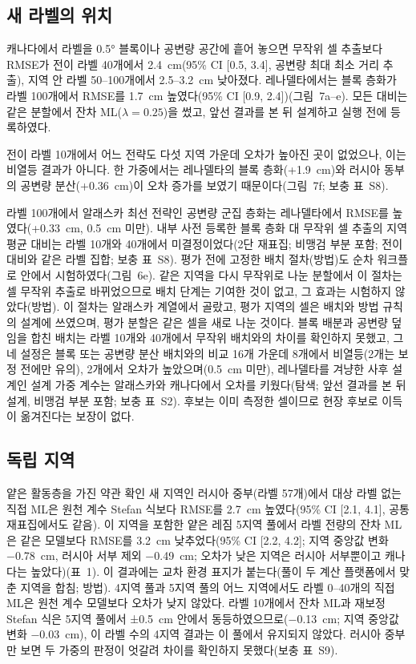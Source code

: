 \subsection{새 라벨의 위치}
\label{sec:results-placement}

캐나다에서 라벨을 0.5° 블록이나 공변량 공간에 흩어 놓으면 무작위 셀 추출보다 RMSE가 전이 라벨 40개에서 2.4~cm(95\% CI [0.5, 3.4], 공변량 최대 최소 거리 추출), 지역 안 라벨 50--100개에서 2.5--3.2~cm 낮아졌다. 레나델타에서는 블록 층화가 라벨 100개에서 RMSE를 1.7~cm 높였다(95\% CI [0.9, 2.4])(그림~7a--e).
모든 대비는 같은 분할에서 잔차 ML($\lambda = 0.25$)을 썼고, 앞선 결과를 본 뒤 설계하고 실행 전에 등록하였다.

전이 라벨 10개에서 어느 전략도 다섯 지역 가운데 오차가 높아진 곳이 없었으나, 이는 비열등 결과가 아니다. 한 가중에서는 레나델타의 블록 층화(+1.9~cm)와 러시아 동부의 공변량 분산(+0.36~cm)이 오차 증가를 보였기 때문이다(그림~7f; 보충 표~S8).

라벨 100개에서 알래스카 최선 전략인 공변량 군집 층화는 레나델타에서 RMSE를 높였다(+0.33~cm, 0.5~cm 미만).
내부 사전 등록한 블록 층화 대 무작위 셀 추출의 지역 평균 대비는 라벨 10개와 40개에서 미결정이었다(2단 재표집; 비맹검 부분 포함; 전이 대비와 같은 라벨 집합; 보충 표~S8).
평가 전에 고정한 배치 절차(방법)도 순차 워크플로 안에서 시험하였다(그림~6e).
같은 지역을 다시 무작위로 나눈 분할에서 이 절차는 셀 무작위 추출로 바뀌었으므로 배치 단계는 기여한 것이 없고, 그 효과는 시험하지 않았다(방법). 이 절차는 알래스카 계열에서 골랐고, 평가 지역의 셀은 배치와 방법 규칙의 설계에 쓰였으며, 평가 분할은 같은 셀을 새로 나눈 것이다.
블록 배분과 공변량 덮임을 합친 배치는 라벨 10개와 40개에서 무작위 배치와의 차이를 확인하지 못했고, 그 네 설정은 블록 또는 공변량 분산 배치와의 비교 16개 가운데 8개에서 비열등(2개는 보정 전에만 유의), 2개에서 오차가 높았으며(0.5~cm 미만), 레나델타를 겨냥한 사후 설계인 설계 가중 계수는 알래스카와 캐나다에서 오차를 키웠다(탐색; 앞선 결과를 본 뒤 설계, 비맹검 부분 포함; 보충 표~S2).
후보는 이미 측정한 셀이므로 현장 후보로 이득이 옮겨진다는 보장이 없다.

\subsection{독립 지역}
\label{sec:results-independent}

얕은 활동층을 가진 약관 확인 새 지역인 러시아 중부(라벨 57개)에서 대상 라벨 없는 직접 ML은 원천 계수 Stefan 식보다 RMSE를 2.7~cm 높였다(95\% CI [2.1, 4.1], 공통 재표집에서도 같음). 이 지역을 포함한 얕은 레짐 5지역 풀에서 라벨 전량의 잔차 ML은 같은 모델보다 RMSE를 3.2~cm 낮추었다(95\% CI [2.2, 4.2]; 지역 중앙값 변화 −0.78~cm, 러시아 서부 제외 −0.49~cm; 오차가 낮은 지역은 러시아 서부뿐이고 캐나다는 높았다)(표~1).
이 결과에는 교차 환경 표지가 붙는다(풀이 두 계산 플랫폼에서 맞춘 지역을 합침; 방법).
4지역 풀과 5지역 풀의 어느 지역에서도 라벨 0--40개의 직접 ML은 원천 계수 모델보다 오차가 낮지 않았다.
라벨 10개에서 잔차 ML과 재보정 Stefan 식은 5지역 풀에서 ±0.5~cm 안에서 동등하였으므로(−0.13~cm; 지역 중앙값 변화 −0.03~cm), 이 라벨 수의 4지역 결과는 이 풀에서 유지되지 않았다.
러시아 중부만 보면 두 가중의 판정이 엇갈려 차이를 확인하지 못했다(보충 표~S9).

